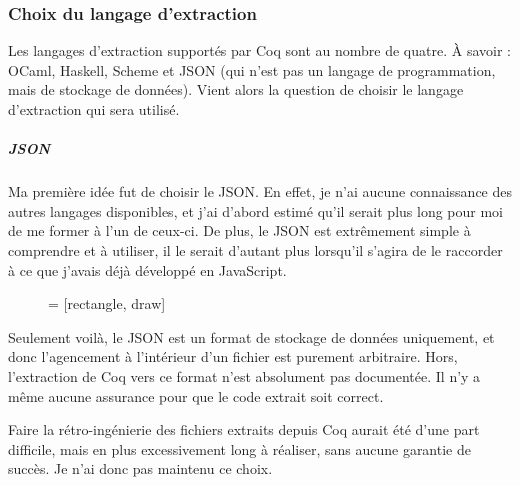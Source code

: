 \documentclass[]{article}
\begin{document}
\subsubsection{Choix du langage d'extraction}
Les langages d'extraction supportés par Coq sont au nombre de quatre. À savoir : OCaml, Haskell, Scheme et JSON (qui n'est pas un langage de programmation, mais de stockage de données). Vient alors la question de choisir le langage d'extraction qui sera utilisé.

\subparagraph*{JSON}
Ma première idée fut de choisir le JSON. En effet, je n'ai aucune connaissance des autres langages disponibles, et j'ai d'abord estimé qu'il serait plus long pour moi de me former à l'un de ceux-ci. De plus, le JSON est extrêmement simple à comprendre et à utiliser, il le serait d'autant plus lorsqu'il s'agira de le raccorder à ce que j'avais déjà développé en JavaScript.
\begin{figure}[H]
	\begin{center}
		 = [rectangle, draw]
	\end{center}
\end{figure}
Seulement voilà, le JSON est un format de stockage de données uniquement, et donc l'agencement à l'intérieur d'un fichier est purement arbitraire. Hors, l'extraction de Coq vers ce format n'est absolument pas documentée. Il n'y a même aucune assurance pour que le code extrait soit correct.

Faire la rétro-ingénierie des fichiers extraits depuis Coq aurait été d'une part difficile, mais en plus excessivement long à réaliser, sans aucune garantie de succès. Je n'ai donc pas maintenu ce choix.
\end{document}
